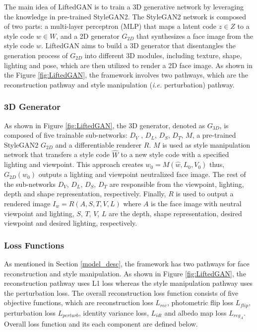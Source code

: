 The main idea of LiftedGAN is to train a 3D generative network by leveraging the knowledge in pre-trained StyleGAN2. The StyleGAN2 network is composed of two parts: a multi-layer perceptron (MLP) that maps a latent code $z \in Z$ to a style code $w \in W$, and a 2D generator $G_{2D}$ that synthesizes a face image from the style code $w$. LiftedGAN aims to build a 3D generator that disentangles the generation process of $G_{2D}$ into different 3D modules, including texture, shape, lighting and pose, which are then utilized to render a 2D face image. As shown in the Figure \ref{fig:LiftedGAN}, the framework involves two pathways, which are the reconstruction pathway and style manipulation (\textit{i.e.} perturbation) pathway. 

\subsubsection{3D Generator}
As shown in Figure \ref{fig:LiftedGAN}, the 3D generator, denoted as $G_{3D}$, is composed of five trainable sub-networks: $D_V$ , $D_L$, $D_S$, $D_T$, $M$, a pre-trained StyleGAN2 $G_{2D}$ and a differentiable renderer $R$. $M$ is used as style manipulation network that transfers a style code $\hat{W}$ to a new style code with a specified lighting and viewpoint. This approach creates $w_0 = M(\hat{w}, L_0, V_0)$ thus, $G_{2D}(w_0)$ outputs a lighting and viewpoint neutralized face image. The rest of the sub-networks $D_V$, $D_L$, $D_S$, $D_T$ are responsible from the viewpoint, lighting, depth and shape representation, respectively. Finally, $R$ is used to output a rendered image $I_w = R(A,S,T,V,L)$ where $A$ is the face image with neutral viewpoint and lighting, $S$, $T$, $V$, $L$ are the depth, shape representation, desired viewpoint and desired lighting, respectively.

\subsubsection{Loss Functions}
As mentioned in Section \ref{model_desc}, the framework has two pathways for face reconstruction and style manipulation. As shown in Figure \ref{fig:LiftedGAN}, the reconstruction pathway uses L1 loss whereas the style manipulation pathway uses the perturbation loss. The overall reconstruction loss function consists of five objective functions, which are reconstruction loss $L_{rec}$, photometric flip loss $L_{flip}$, perturbation loss $L_{perturb}$, identity variance loss, $L_{idt}$ and albedo map loss $L_{reg_A}$. Overall loss function and its each component are defined below.

